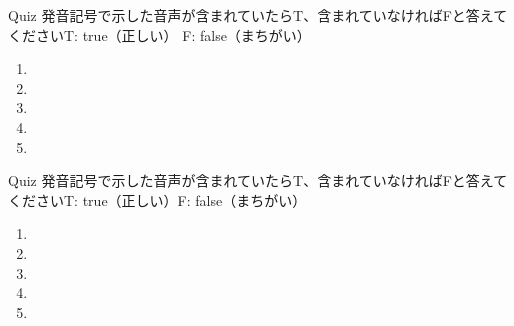\documentclass[aspectratio=169,xcolor={dvipsnames,table}]{beamer}
\begin{document}
\begin{frame}[plain]{Quiz }
\large
発音記号で示した音声が含まれていたらT、含まれていなければFと答えてください\hfill{}{\scriptsize T: true（正しい）\hspace{5pt} F: false（まちがい）}
 \begin{enumerate}
  \item \mbox{}\hspace{1\zw}
  \item \mbox{}\hspace{1\zw}
  \item \mbox{}\visible<4->{T}\hspace{1\zw}
  \item \mbox{}\hspace{1\zw}
  \item \mbox{}\hspace{1\zw}
 \end{enumerate}

\hfill{}
\end{frame}
\begin{frame}[plain]{Quiz }
\large
発音記号で示した音声が含まれていたらT、含まれていなければFと答えてください\hfill{}{\scriptsize T: true（正しい）\hspace{5pt}F: false（まちがい）}
 \begin{enumerate}
  \item \mbox{}\visible<2->{T}\hspace{1\zw}
  \item \mbox{}\hspace{1\zw}
  \item \mbox{}\visible<4->{F}\hspace{1\zw}
  \item \mbox{}\hspace{1\zw}
  \item \mbox{}\hspace{1\zw}
 \end{enumerate}

\hfill{}
\end{frame}
\end{document}
